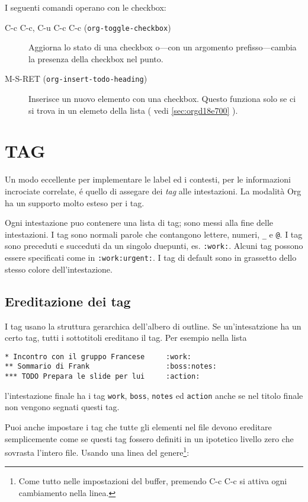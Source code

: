 \documentclass[11pt]{article}
\begin{document}
I seguenti comandi operano con le checkbox:

\begin{description}
\item[{C-c C-c, C-u C-c C-c (\texttt{org-toggle-checkbox})}] Aggiorna lo stato di una checkbox o---con un argomento
prefisso---cambia la presenza della checkbox nel punto.

\item[{M-S-RET (\texttt{org-insert-todo-heading})}] Inserisce un nuovo elemento con una checkbox. Questo funziona solo
se ci si trova in un elemeto della lista ( vedi \ref{sec:orgd18e700} ).
\end{description}

\section{TAG}
\label{sec:org384d6f8}
Un modo eccellente per implementare le label ed i contesti, per le
informazioni incrociate correlate, é quello di assegare dei \emph{tag} alle
intestazioni. La modalità Org ha un supporto molto esteso per i tag.

Ogni intestazione puo contenere una lista di tag; sono messi alla fine
delle intestazioni. I tag sono normali parole che contangono lettere,
numeri, \texttt{\_} e \texttt{@}. I tag sono preceduti e succeduti da un singolo
duepunti, es. \texttt{:work:}. Alcuni tag possono essere specificati come in
\texttt{:work:urgent:}. I tag di default sono in grassetto dello stesso
colore dell'intestazione.

\subsection*{Ereditazione dei tag}
\label{sec:orgcc2d20c}
I tag usano la struttura gerarchica dell'albero di outline. Se
un'intesatzione ha un certo tag, tutti i sottotitoli ereditano il
tag. Per esempio nella lista

\begin{verbatim}
* Incontro con il gruppo Francese     :work:
** Sommario di Frank                  :boss:notes:
*** TODO Prepara le slide per lui     :action:
\end{verbatim}

l'intestazione finale ha i tag \texttt{work}, \texttt{boss}, \texttt{notes} ed \texttt{action} anche se nel titolo finale non vengono segnati
questi tag.

Puoi anche impostare i tag che tutte gli elementi nel file devono
ereditare semplicemente come se questi tag fossero definiti in un
ipotetico livello zero che sovrasta l'intero file. Usando una linea
del genere\footnote{Come tutto nelle impostazioni del buffer, premendo C-c C-c si attiva ogni cambiamento nella linea.}:
\end{document}
